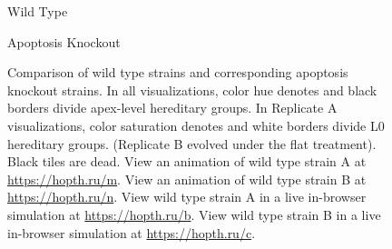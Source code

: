 \begin{figure}[!htbp]
\begin{center}
\begin{minipage}[t]{0.5\linewidth}
\vspace{1.0ex}

\hspace*{\fill}%
\begin{minipage}[t]{0.05\linewidth}
\vspace{0pt} %
\end{minipage}%
\hfill
\begin{minipage}[t]{0.45\linewidth}
\centering
\vspace{0pt} %
Wild Type
\end{minipage}%
\hfill
\begin{minipage}[t]{0.45\linewidth}
\centering
\vspace{0pt} %
Apoptosis Knockout
\end{minipage}%
\hspace*{\fill}
\end{minipage}

\caption{
Comparison of wild type strains and corresponding apoptosis knockout strains.
In all visualizations, color hue denotes and black borders divide apex-level hereditary groups.
In Replicate A visualizations, color saturation denotes and white borders divide L0 hereditary groups.
(Replicate B evolved under the flat treatment).
Black tiles are dead.
View an animation of wild type strain A at \url{https://hopth.ru/m}.
View an animation of wild type strain B at \url{https://hopth.ru/n}.
View wild type strain A in a live in-browser simulation at \url{https://hopth.ru/b}.
View wild type strain B in a live in-browser simulation at \url{https://hopth.ru/c}.
}
\label{fig:ko-apoptosis}
\end{center}
\end{figure}
